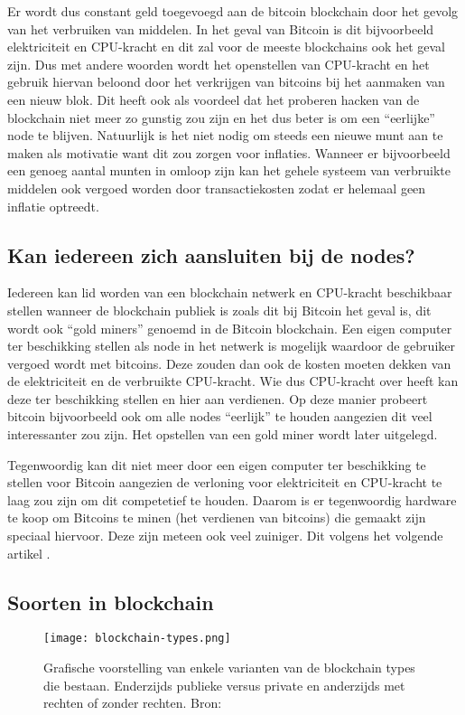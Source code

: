 Er wordt dus constant geld toegevoegd aan de bitcoin blockchain door het gevolg van het verbruiken van middelen. In het geval van Bitcoin is dit bijvoorbeeld elektriciteit en CPU-kracht en dit zal voor de meeste blockchains ook het geval zijn. Dus met andere woorden wordt het openstellen van CPU-kracht en het gebruik hiervan beloond door het verkrijgen van bitcoins bij het aanmaken van een nieuw blok. Dit heeft ook als voordeel dat het proberen hacken van de blockchain niet meer zo gunstig zou zijn en het dus beter is om een ``eerlijke'' node te blijven. Natuurlijk is het niet nodig om steeds een nieuwe munt aan te maken als motivatie want dit zou zorgen voor inflaties. Wanneer er bijvoorbeeld een genoeg aantal munten in omloop zijn kan het gehele systeem van verbruikte middelen ook vergoed worden door transactiekosten zodat er helemaal geen inflatie optreedt.

\subsection{Kan iedereen zich aansluiten bij de nodes?}
Iedereen kan lid worden van een blockchain netwerk en CPU-kracht beschikbaar stellen wanneer de blockchain publiek is zoals dit bij Bitcoin het geval is, dit wordt ook ``gold miners'' genoemd in de Bitcoin blockchain. Een eigen computer ter beschikking stellen als node in het netwerk is mogelijk waardoor de gebruiker vergoed wordt met bitcoins. Deze zouden dan ook de kosten moeten dekken van de elektriciteit en de verbruikte CPU-kracht. Wie dus CPU-kracht over heeft kan deze ter beschikking stellen en hier aan verdienen. Op deze manier probeert  bitcoin bijvoorbeeld ook om alle nodes ``eerlijk'' te houden aangezien dit veel interessanter zou zijn. Het opstellen van een gold miner wordt later uitgelegd. 

Tegenwoordig kan dit niet meer door een eigen computer ter beschikking te stellen voor Bitcoin aangezien de verloning voor elektriciteit en CPU-kracht te laag zou zijn om dit competetief te houden. Daarom is er tegenwoordig hardware te koop om Bitcoins te minen (het verdienen van bitcoins) die gemaakt zijn speciaal hiervoor. Deze zijn meteen ook veel zuiniger. Dit volgens het volgende artikel \textcite{Bitcoinmining.com}.
 
\subsection{Soorten in blockchain}

\begin{figure}
	\texttt{[image: blockchain-types.png]}
	\caption{Grafische voorstelling van enkele varianten van de blockchain types die bestaan. Enderzijds publieke versus private en anderzijds met rechten of zonder rechten. Bron: \textcite{Kravchenko2016}}
	\label{fig:blockchain-types}
\end{figure}

